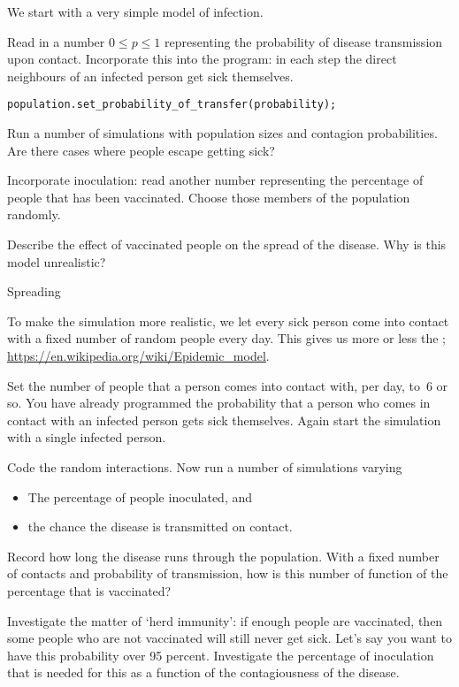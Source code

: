 We start with a very simple model of infection.

\begin{exercise}
  \label{ex:infect:1}
  Read in a number $0\leq p \leq 1$ representing the probability of
  disease transmission upon contact. Incorporate this into the
  program: in each step the direct neighbours of an infected person
  get sick themselves.
\begin{verbatim}
population.set_probability_of_transfer(probability);  
\end{verbatim}
  Run a number of simulations with population sizes and contagion
  probabilities. Are there cases where people escape getting sick?
\end{exercise}

\begin{exercise}
  \label{ex:infect:2}
  Incorporate inoculation: read another number representing the
  percentage of people that has been vaccinated. Choose those members
  of the population randomly.

  Describe the effect of vaccinated people on the spread of the
  disease. Why is this model unrealistic?
\end{exercise}

 {Spreading}

To make the simulation more realistic, we let every sick person come
into contact with a fixed number of random people every day. This
gives us more or less the ;
\url{https://en.wikipedia.org/wiki/Epidemic_model}.

Set the number of people that a person comes into contact with, per
day, to~6 or so. You have already programmed the probability that a
person who comes in contact with an infected person gets sick themselves.
Again start the simulation with a single infected person.

\begin{exercise}
  \label{ex:infect:3}
  Code the random interactions. Now run a number of simulations varying
  \begin{itemize}
  \item The percentage of people inoculated, and
  \item the chance the disease is transmitted on contact.
  \end{itemize}
  Record how long the disease runs through the population. With a
  fixed number of contacts and probability of transmission, how is
  this number of function of the percentage that is vaccinated?

  Investigate the matter of `herd immunity': if enough people are
  vaccinated, then some people who are not vaccinated will still never get
  sick. Let's say you want to have this probability over 95
  percent. Investigate the percentage of inoculation that is needed
  for this as a function of the contagiousness of the disease.
\end{exercise}

